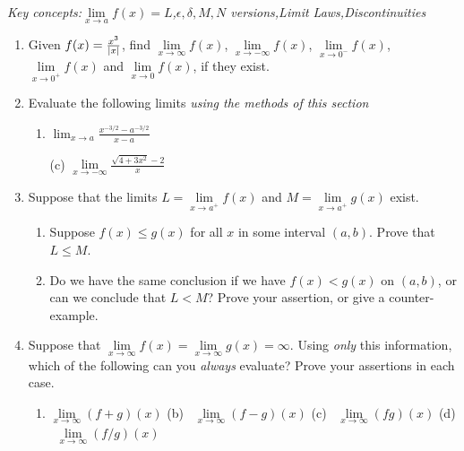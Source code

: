 \begin{exercises}
	\emph{Key concepts:\quad $\lim\limits_{x\to a}f(x)=L$,\quad $\epsilon,\delta,M,N$  versions,\quad Limit Laws,\quad Discontinuities}
	
	\begin{enumerate}\itemsep0pt
	  \item Given $f(x)=\frac{x^3}{\left| x\right|}$, find $\lim\limits_{x\to\infty}f(x)$, $\lim\limits_{x\to-\infty}f(x)$, $\lim\limits_{x\to 0^-}f(x)$, $\lim\limits_{x\to 0^+}f(x)$ and $\lim\limits_{x\to 0}f(x)$, if they exist.
	  
	  \item Evaluate the following limits \emph{using the methods of this section}
	  \begin{enumerate}
	    \item {}
	    \space$\displaystyle\lim_{x\to a}\frac{x^{-3/2}-a^{-3/2}}{x-a}$
	    \item[(c)] 
	    \space $\displaystyle\lim\limits_{x\to -\infty}\frac{\sqrt{4+3x^2}-2}{x}$
	  \end{enumerate}
	  
	  
	  \item Suppose that the limits $L=\lim\limits_{x\to a^+}f(x)$ and $M=\lim\limits_{x\to a^+}g(x)$ exist.
	  \begin{enumerate}
	    \item Suppose $f(x)\le g(x)$ for all $x$ in some interval $(a,b)$. Prove that $L\le M$.
	    \item Do we have the same conclusion if we have $f(x)<g(x)$ on $(a,b)$, or can we conclude that $L<M$? Prove your assertion, or give a counter-example.
	  \end{enumerate}
	  
	  
	  \item Suppose that $\lim\limits_{x\to\infty}f(x)=\lim\limits_{x\to\infty}g(x)=\infty$. Using \emph{only} this information, which of the following can you \emph{always} evaluate? Prove your assertions in each case.
	  \begin{enumerate}
	    \item $\lim\limits_{x\to\infty}(f+g)(x)$\qquad
			(b) \ $\lim\limits_{x\to\infty}(f-g)(x)$\qquad
			(c) \ $\lim\limits_{x\to\infty}(fg)(x)$\qquad
			(d) \ $\lim\limits_{x\to\infty}(f/g)(x)$
	  \end{enumerate}
	  

\end{enumerate}
\end{exercises}
